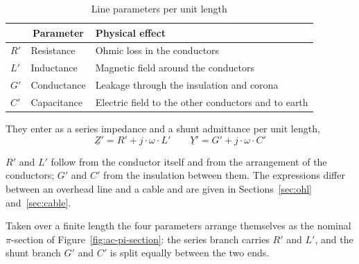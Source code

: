 \begin{table}[!ht]
  \centering
  \begin{tabularx}{\linewidth}{@{}l l X@{}}
    \toprule
    & \multicolumn{1}{c}{\textbf{Parameter}} & \textbf{Physical effect} \\
    \midrule
    $R'$ & Resistance  & Ohmic loss in the conductors \\
    $L'$ & Inductance  & Magnetic field around the conductors \\
    $G'$ & Conductance & Leakage through the insulation and corona \\
    $C'$ & Capacitance & Electric field to the other conductors and to earth \\
    \bottomrule
  \end{tabularx}
  \caption{Line parameters per unit length}
  \label{tab:ac-parameters}
\end{table}

They enter as a series impedance and a shunt admittance per unit length,
\begin{equation}
  \underline{Z}' = R' + j \cdot \omega \cdot L'
  \qquad
  \underline{Y}' = G' + j \cdot \omega \cdot C'
  \label{eq:ac-zy-prime}
\end{equation}

$R'$ and $L'$ follow from the conductor itself and from the arrangement of
the conductors; $G'$ and $C'$ from the insulation between them. The
expressions differ between an overhead line and a cable and are given in
Sections~\ref{sec:ohl} and~\ref{sec:cable}.

Taken over a finite length the four parameters arrange themselves as the
nominal $\pi$-section of Figure~\ref{fig:ac-pi-section}: the series branch
carries $R'$ and $L'$, and the shunt branch $G'$ and $C'$ is split equally
between the two ends.

